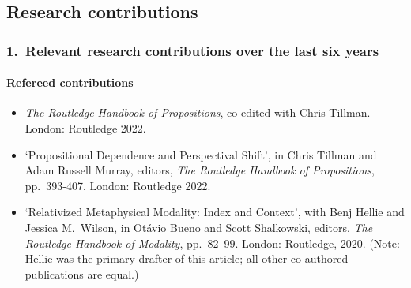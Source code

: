 \documentclass[12pt]{article}
\begin{document}
\subsection*{Research contributions}

\subsubsection*{1.\ \quad Relevant research contributions over the last six years}

\paragraph{Refereed contributions}

\begin{itemize}
	\item[] \emph{The Routledge Handbook of Propositions}, co-edited with
Chris Tillman. London: Routledge 2022.  
	\item[] `Propositional Dependence and Perspectival Shift', in Chris
Tillman and Adam Russell Murray, editors, \emph{The Routledge Handbook of
Propositions}, pp.\ 393-407. London: Routledge 2022.  
	\item[] `Relativized Metaphysical Modality: Index and Context', with
Benj Hellie and Jessica M.\ Wilson, in Ot\'avio Bueno and Scott Shalkowski,
editors, \emph{The Routledge Handbook of Modality}, pp.~82--99. London:
Routledge, 2020. (Note: Hellie was the primary drafter of this article; all
other co-authored publications are equal.)
	
\end{itemize}
\end{document}
